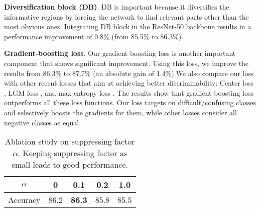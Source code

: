 \documentclass[letterpaper]{article} \usepackage{aaai20}  \usepackage{times}  \usepackage{helvet} \usepackage{courier}  \usepackage[hyphens]{url}  \usepackage{graphicx} \usepackage{multirow}
\begin{document}
\textbf{Diversification block (DB)}. DB is important because it diversifies the informative regions by forcing the network to find relevant parts other than the most obvious ones. Integrating DB block in the ResNet-50 backbone results in a performance improvement of 0.8\%  (from 85.5\% to 86.3\%). 

\begin{table}[h]
\centering
{}
\caption{Ablation analysis on the CUB-200-2011. Our diversification block (DB) and gradient-boosting loss provide progressive improvements over the baseline.}
\label{tab:ablation_study}
\end{table}

\textbf{Gradient-boosting loss}. Our gradient-boosting loss is another important component that shows significant improvement. Using this loss, we improve the results from 86.3\% to 87.7\% (an absolute gain of 1.4\%).We also compare our loss with other recent losses that aim at achieving better discriminability: Center loss \cite{center_loss}, LGM loss \cite{lgm_loss}, and max entropy loss \cite{max_entropy}.  The results show that gradient-boosting loss outperforms all these loss functions. Our loss targets on difficult/confusing classes and selectively boosts the gradients for them, while other losses consider all negative classes as equal.
\begin{table}[t]
\centering
\begin{tabular}{| *{5}{c|}}
\hline
\centering
   $\alpha$   & 0 & 0.1 &0.2 & 1.0 \\ \hline
Accuracy & 86.2  &  \textbf{86.3}   &  85.8   & 85.5 \\ \hline
\end{tabular}
\caption{Ablation study on suppressing factor $\alpha$. Keeping suppressing factor as small leads to good performance.}
\label{tab:ablation_alpha}
\end{table}
\end{document}
